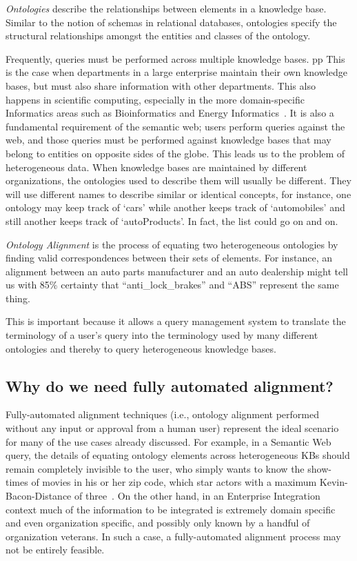 \documentclass[letterpaper,twocolumn,12pt]{article}
\begin{document}
\textit{Ontologies} describe the relationships between elements in a knowledge base.
Similar to the notion of schemas in relational databases, ontologies specify the structural relationships amongst the entities and classes of the ontology.

Frequently, queries must be performed across multiple knowledge bases. pp
This is the case when departments in a large enterprise maintain their own knowledge bases, but must also share information with other departments. 
This also happens in scientific computing, especially in the more domain-specific Informatics areas such as Bioinformatics and Energy Informatics~\cite{cotterell:2012:oei}.
It is also a fundamental requirement of the semantic web; users perform queries against the web, and those queries must be performed against knowledge bases that may belong to entities on opposite sides of the globe. 
This leads us to the problem of heterogeneous data. 
When knowledge bases are maintained by different organizations, the ontologies used to describe them will usually be different. 
They will use different names to describe similar or identical concepts, for instance, one ontology may keep track of `cars' while another keeps track of `automobiles' and still another keeps track of `autoProducts'. 
In fact, the list could go on and on.

\textit{Ontology Alignment} is the process of equating two heterogeneous ontologies by finding valid correspondences between their sets of elements. 
%
For instance, an alignment between an auto parts manufacturer and an auto dealership might tell us with 85\% certainty that ``anti\_lock\_brakes'' and ``ABS'' represent the same thing.

This is important because it allows a query management system to translate the terminology of a user's query into the terminology used by many different ontologies and thereby to query heterogeneous knowledge bases.

\subsection{Why do we need fully automated alignment?}
\label{subsec:automated}
Fully-automated alignment techniques (i.e., ontology alignment performed without any input or approval from a human user) represent the ideal scenario for many of the use cases already discussed. 
For example, in a Semantic Web query, the details of equating ontology elements across heterogeneous KBs should remain completely invisible to the user, who simply wants to know the show-times of movies in his or her zip code, which star actors with a maximum Kevin-Bacon-Distance of three~\cite{hayes:2000:graph}.
On the other hand, in an Enterprise Integration context much of the information to be integrated is extremely domain specific and even organization specific, and possibly only known by a handful of organization veterans. 
In such a case, a fully-automated alignment process may not be entirely feasible.
\end{document}
